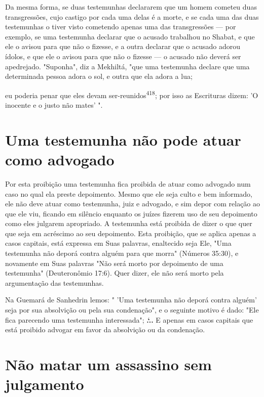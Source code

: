 \begin{itemize}
\begin{enumrate}
\begin{itemize}
\begin{itemize}
\begin{itemize}
Da mesma forma, se duas testemunhas declararem que um homem cometeu duas
transgressões, cujo castigo por cada uma delas é a morte, e se cada uma
das duas testemunhas o tiver visto cometendo apenas uma das
trans­gressões --- por exemplo, se uma testemunha declarar que o acusado
trabalhou no Shabat, e que ele o avisou para que não o fizesse, e a
outra declarar que o acusado adorou ídolos, e que ele o avisou para que
não o fizesse --- o acusado não deverá ser apedrejado. "Suponha", diz a
Mekhiltá, "que uma testemunha declare que uma determinada pessoa adora o
sol, e outra que ela adora a lua;

eu poderia penar que eles devam ser-reunidos\textsuperscript{418}; por
isso as Escrituras dizem: 'O inocente e o justo não mates' ".

\section{Uma testemunha não pode atuar como advogado}

Por esta proibição uma testemunha fica proibida de atuar como ad­vogado
num caso no qual ela preste depoimento. Mesmo que ele seja culto e bem
informado, ele não deve atuar como testemunha, juiz e advogado, e sim
depor com relação ao que ele viu, ficando em silêncio enquanto os juízes
fize­rem uso de seu depoimento como eles julgarem apropriado. A
testemunha está proibida de dizer o que quer que seja em acréscimo ao
seu depoimento. Esta proibição, que se aplica apenas a casos capitais,
está expressa em Suas palavras, enaltecido seja Ele, "Uma testemunha não
deporá contra alguém para que mor­ra" (Números 35:30), e novamente em
Suas palavras "Não será morto por de­poimento de uma testemunha"
(Deuteronômio 17:6). Quer dizer, ele não será morto pela argumentação
das testemunhas.

Na Guemará de Sanhedrin lemos: " 'Uma testemunha não deporá con­tra
alguém' seja por sua absolvição ou pela sua condenação", e o seguinte
moti­vo é dado: "Ele fica parecendo uma testemunha interessada";
\textbf{.`..} E apenas em casos
capitais que está proibido advogar em favor da absolvição ou da
condenação.

\section{Não matar um assassino sem julgamento}


\end{itemize}
\end{itemize}
\end{itemize}
\end{enumrate}
\end{itemize}
